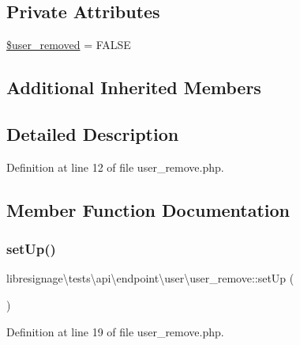 \subsection*{Private Attributes}
\begin{DoxyCompactItemize}
\item 
\hyperlink{classlibresignage_1_1tests_1_1api_1_1endpoint_1_1user_1_1user__remove_acb6dbdcfecae950c8dcea5ab930aba85}{\$user\+\_\+removed} = F\+A\+L\+SE
\end{DoxyCompactItemize}
\subsection*{Additional Inherited Members}


\subsection{Detailed Description}


Definition at line 12 of file user\+\_\+remove.\+php.



\subsection{Member Function Documentation}
\mbox{\label{classlibresignage_1_1tests_1_1api_1_1endpoint_1_1user_1_1user__remove_a793678d42690e4ec52007723aa5904a6}} 
\subsubsection{\texorpdfstring{set\+Up()}{setUp()}}
{\footnotesize\ttfamily libresignage\textbackslash{}tests\textbackslash{}api\textbackslash{}endpoint\textbackslash{}user\textbackslash{}user\+\_\+remove\+::set\+Up (\begin{DoxyParamCaption}{ }\end{DoxyParamCaption})}



Definition at line 19 of file user\+\_\+remove.\+php.

